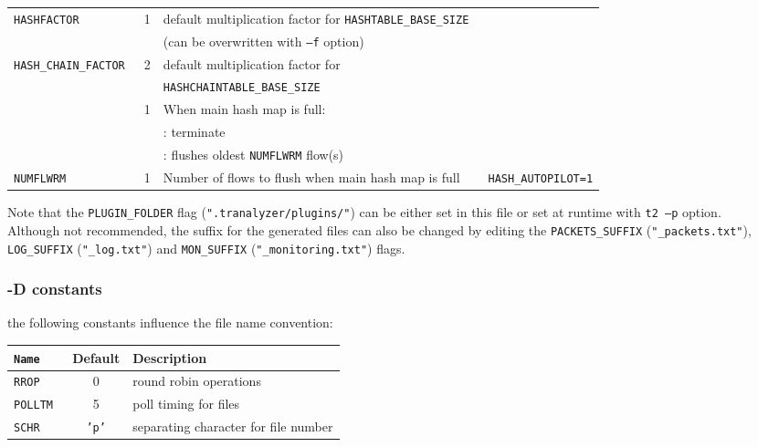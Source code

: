 \begin{longtable}{>{\tt}lcl>{\tt\small}l}
    \\
    HASHFACTOR               & 1                  & default multiplication factor for {\tt\small HASHTABLE\_BASE\_SIZE} & \\
                             &                    & (can be overwritten with {\tt --f} option)                          & \\
    HASH\_CHAIN\_FACTOR      & 2                  & default multiplication factor for                                   & \\
                             &                    & {\tt\small HASHCHAINTABLE\_BASE\_SIZE}                              & \\
    \nameref{hash_autopilot} & 1                  & When main hash map is full:                                         & \\
                             &                    & \qquad 0: terminate                                                 & \\
                             &                    & \qquad 1: flushes oldest {\tt NUMFLWRM} flow(s)                     & \\
    NUMFLWRM                 & 1                  & Number of flows to flush when main hash map is full                 & HASH\_AUTOPILOT=1\\
    \bottomrule
\end{longtable}

Note that the {\tt PLUGIN\_FOLDER} flag ({\tt ".tranalyzer/plugins/"}) can be either set in this file or set at runtime with {\tt t2 --p} option.\\
Although not recommended, the suffix for the generated files can also be changed by editing the {\tt PACKETS\_SUFFIX} ({\tt "\_packets.txt"}), {\tt LOG\_SUFFIX} ({\tt "\_log.txt"}) and {\tt MON\_SUFFIX} ({\tt "\_monitoring.txt"}) flags.

\subsubsection{-D constants}
the following constants influence the file name convention:

\begin{longtable}{>{\tt}lcl}
    \toprule
    {\bf Name} & {\bf Default}   & {\bf Description}\\
    \midrule\endhead%
    RROP       & 0               & round robin operations \\
    POLLTM     & 5               & poll timing for files \\
    SCHR       & {\tt\small 'p'} & separating character for file number \\
    \bottomrule
\end{longtable}

